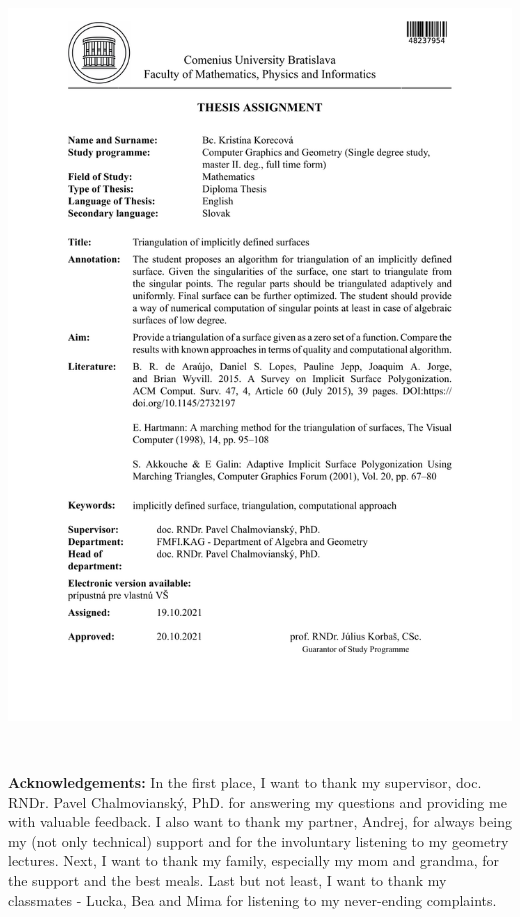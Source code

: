 \documentclass[12pt, twoside]{book}
\begin{document}
\hspace{-2cm}\includegraphics[page=2,width=1.1\textwidth]{images/zadanie-sk}


\frontmatter

\setcounter{page}{3}
\newpage 
~

\vfill
{\bf Acknowledgements:} In the first place, I want to thank my supervisor, doc.
RNDr. Pavel Chalmovianský, PhD. for answering my questions and providing me 
with valuable feedback.
I also want to thank my partner, Andrej, for always being my (not only technical)
support and for the involuntary listening to my geometry lectures. Next, I want to 
thank my family, especially my mom and grandma, for the support and the best meals.
Last but not least, I want to thank my classmates - Lucka, Bea and Mima for listening
to my never-ending complaints.
\end{document}
